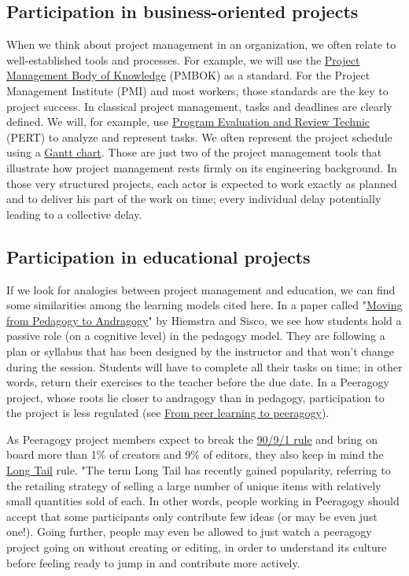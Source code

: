 \subsection{Participation in business-oriented projects}

When we think about project management in an organization, we often
relate to well-established tools and processes. For example, we will use
the \href{http://www.pmi.org/PMBOK-Guide-and-Standards.aspx}{Project
Management Body of Knowledge} (PMBOK) as a standard. For the Project
Management Institute (PMI) and most workers, those standards are the key
to project success. In classical project management, tasks and deadlines
are clearly defined. We will, for example, use
\href{http://en.wikipedia.org/wiki/PERT}{Program Evaluation and Review
Technic} (PERT) to analyze and represent tasks. We often represent the
project schedule using a
\href{http://en.wikipedia.org/wiki/Gantt\_chart}{Gantt chart}. Those are
just two of the project management tools that illustrate how project
management rests firmly on its engineering background. In those very
structured projects, each actor is expected to work exactly as planned
and to deliver his part of the work on time; every individual delay
potentially leading to a collective delay.

\subsection{Participation in educational projects}

If we look for analogies between project management and education, we
can find some similarities among the learning models cited here. In a
paper called "\href{http://www-distance.syr.edu/andraggy.html}{Moving
from Pedagogy to Andragogy}" by Hiemstra and Sisco, we see how students
hold a passive role (on a cognitive level) in the pedagogy model. They
are following a plan or syllabus that has been designed by the
instructor and that won't change during the session. Students will have
to complete all their tasks on time; in other words, return their
exercises to the teacher before the due date. In a Peeragogy project,
whose roots lie closer to andragogy than in pedagogy, participation to
the project is less regulated (see
\href{http://peeragogy.org/to-peeragogy/}{From peer learning to
peeragogy}).

As Peeragogy project members expect to break the
\href{http://en.wikipedia.org/wiki/1\%25\_rule\_\%28Internet\_culture\%29}{90/9/1
rule} and bring on board more than 1\% of creators and 9\% of editors,
they also keep in mind the
\href{http://en.wikipedia.org/wiki/Long\_Tail}{Long Tail} rule. "The
term Long Tail has recently gained popularity, referring to the
retailing strategy of selling a large number of unique items with
relatively small quantities sold of each. In other words, people working
in Peeragogy should accept that some participants only contribute few
ideas (or may be even just one!). Going further, people may even be
allowed to just watch a peeragogy project going on without creating or
editing, in order to understand its culture before feeling ready to jump
in and contribute more actively.
